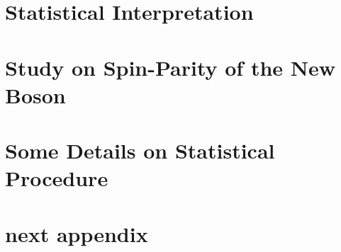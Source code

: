 \documentclass[12pt,chapterheads]{ucsd}
\begin{document}
%
\chapter{Statistical Interpretation}
\label{ch:stat_interpret}


%
\chapter{Study on Spin-Parity of the New Boson}
\label{ch:study_spin}


\appendix

%
\chapter{Some Details on Statistical Procedure}
\label{ch:app_stat}


%
\chapter{next appendix}




 \printindex %
\end{document}
